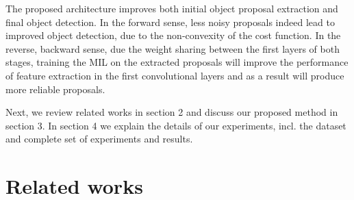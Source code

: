 \documentclass[10pt,twocolumn,letterpaper]{article}
\begin{document}
The proposed architecture improves both initial object proposal extraction and final object detection. In the forward sense, less noisy proposals indeed lead to improved object detection, due to the non-convexity of the cost function. In the reverse, backward sense, due the weight sharing between the first layers of both stages, training the MIL on the extracted proposals will improve the performance of feature extraction in the first convolutional layers and as a result will produce more reliable proposals.

Next, we review related works in section 2 and discuss our proposed method in section 3. In section 4 we explain the details of our experiments, incl. the dataset and complete set of experiments and results.



\section{Related works}
\end{document}
